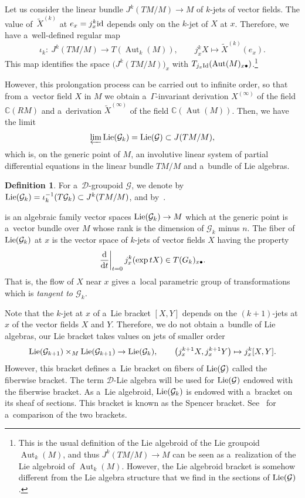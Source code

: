 \documentclass[10pt,a4paper]{amsart}
\numberwithin{equation}{section}
\theoremstyle{definition}
\newtheorem{Definition}[Theorem]{Definition}
\begin{document}
Let us consider the linear bundle $J^k(TM/M)\to M$ of $k$-jets of vector fields. The value of~$\widetilde X^{(k)}$ at $e_x = j^k_x{\rm id}$ depends only on the $k$-jet of $X$ at $x$. Therefore, we have a~well-defined regular map
\[\iota_k \colon\ J^{k}(TM/M) \to T(\operatorname{Aut}_k(M)), \qquad j^k_xX \mapsto \widetilde X^{(k)}(e_x).\]
This map identifies the space $\bigl(J^k(TM/M)\bigr)_x$ with $T_{j_x{\rm Id}}(\operatorname{Aut}(M)_{x\bullet})$.\footnote{This is the usual definition of the Lie algebroid of the Lie groupoid $\operatorname{Aut}_k(M)$, and thus $J^k(TM/M)\to M$ can be seen as a~realization of the Lie algebroid of $\operatorname{Aut}_k(M)$. However, the Lie algebroid bracket is somehow different from the Lie algebra structure that we find in the sections of ${\rm Lie}(\mathcal G)$.}

However, this prolongation process can be carried out to infinite order, so that from a~vector field $X$ in $M$ we obtain a~$\Gamma$-invariant derivation $X^{(\infty)}$ of the field $\mathbb C(RM)$ and a~derivation $\widetilde X^{(\infty)}$ of the field $\mathbb C(\operatorname{Aut}(M))$. Then, we have the limit
\[\varprojlim {\rm Lie}(\mathcal G_k) = {\rm Lie}(\mathcal G) \subset J(TM/M), \]
which is, on the generic point of $M$, an involutive linear system of partial differential equations in the linear bundle $TM/M$ and a~bundle of Lie algebras.

\begin{Definition}For a~$\mathcal D$-groupoid $\mathcal G$, we denote by
 ${\rm Lie}(\mathcal G_k) = \iota_k^{-1}(T\mathcal G_k) \subset J^{k}(TM/M)$, and by~.
\end{Definition}

 is an algebraic family vector spaces ${\rm Lie}(\mathcal G_k)\to M$ which at the generic point is a~vector bundle over $M$ whose rank is the dimension of $\mathcal G_k$ minus $n$. The fiber of ${\rm Lie}(\mathcal G_k)$ at $x$ is the vector space of $k$-jets of vector fields $X$ having the property
\[\left.\frac{{\rm d}}{{\rm d} t}\right\vert_{t=0} j_x^k(\exp tX) \in T\mathcal (G_k)_{x\bullet}.\]
That is, the flow of $X$ near $x$ gives a~local parametric group of transformations which is \emph{tangent to $\mathcal G_k$.}

Note that the $k$-jet at $x$ of a~Lie bracket $[X,Y]$ depends on the $(k+1)$-jets at $x$ of the vector fields $X$ and $Y$. Therefore, we do not obtain a~bundle of Lie algebras, our Lie bracket takes values on jets of smaller order
\[{\rm Lie}(\mathcal G_{k+1}) \times_M {\rm Lie}(\mathcal G_{k+1}) \to {\rm Lie}(\mathcal G_{k}),
 \qquad \bigl(j^{k+1}_x X, j^{k+1}_x Y\bigr) \mapsto j_x^k[X,Y].\]
However, this bracket defines a~Lie bracket on fibers of ${\rm Lie}(\mathcal G)$ called the fiberwise bracket.
The term $\mathcal D$-Lie algebra will be used for ${\rm Lie}(\mathcal G)$ endowed with the fiberwise bracket. As a~Lie algebroid, ${\rm Lie}(\mathcal G_k)$ is endowed with a~bracket on its sheaf of sections. This bracket is known as the Spencer bracket. See~\cite{malgrange2001groupoide} for a~comparison of the two brackets.
\end{document}
